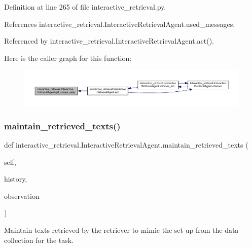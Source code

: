 Definition at line 265 of file interactive\+\_\+retrieval.\+py.



References interactive\+\_\+retrieval.\+Interactive\+Retrieval\+Agent.\+used\+\_\+messages.



Referenced by interactive\+\_\+retrieval.\+Interactive\+Retrieval\+Agent.\+act().

Here is the caller graph for this function\+:
\nopagebreak
\begin{figure}[H]
\begin{center}
\leavevmode
\includegraphics[width=350pt]{classinteractive__retrieval_1_1InteractiveRetrievalAgent_a83b0e3a253116e5ce23a4a9388cbc672_icgraph}
\end{center}
\end{figure}
\mbox{\label{classinteractive__retrieval_1_1InteractiveRetrievalAgent_ae3894ebf2b1bb0695eba66d9b1a0f13f}} 
\subsubsection{\texorpdfstring{maintain\+\_\+retrieved\+\_\+texts()}{maintain\_retrieved\_texts()}}
{\footnotesize\ttfamily def interactive\+\_\+retrieval.\+Interactive\+Retrieval\+Agent.\+maintain\+\_\+retrieved\+\_\+texts (\begin{DoxyParamCaption}\item[{}]{self,  }\item[{}]{history,  }\item[{}]{observation }\end{DoxyParamCaption})}

\begin{DoxyVerb}Maintain texts retrieved by the retriever to mimic the set-up
from the data collection for the task.
\end{DoxyVerb}
 

